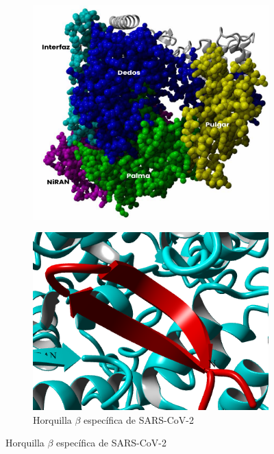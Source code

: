 \documentclass[a4paper,11pt]{report}
\begin{document}
\begin{figure}[h!]
\begin{subfigure}[h]{0.45\textwidth}
 \end{subfigure}
\begin{subfigure}[h]{0.45\textwidth}
	\includegraphics[width=\linewidth]{Figuras/Figura5}
	\caption{}	
\end{subfigure}
\quad
\begin{subfigure}[h]{0.35\textwidth}
	\includegraphics[width=\linewidth]{Figuras/Figura44}
	\caption{Horquilla $\beta$ específica de SARS-CoV-2}
	\label{1º}	
\end{subfigure}
\quad


\end{figure}
\end{document}
